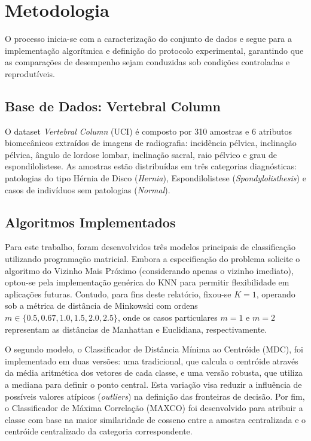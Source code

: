 \section{Metodologia}
\label{chap:metodologia}

O processo inicia-se com a caracterização do conjunto de dados e segue para a implementação algorítmica e definição do protocolo experimental, garantindo que as comparações de desempenho sejam conduzidas sob condições controladas e reprodutíveis.

\subsection{Base de Dados: Vertebral Column}
O dataset \textit{Vertebral Column} (UCI) é composto por 310 amostras e 6 atributos biomecânicos extraídos de imagens de radiografia: incidência pélvica, inclinação pélvica, ângulo de lordose lombar, inclinação sacral, raio pélvico e grau de espondilolistese. As amostras estão distribuídas em três categorias diagnósticas: patologias do tipo Hérnia de Disco (\textit{Hernia}), Espondilolistese (\textit{Spondylolisthesis}) e casos de indivíduos sem patologias (\textit{Normal}).

\subsection{Algoritmos Implementados}
Para este trabalho, foram desenvolvidos três modelos principais de classificação utilizando programação matricial. Embora a especificação do problema solicite o algoritmo do Vizinho Mais Próximo (considerando apenas o vizinho imediato), optou-se pela implementação genérica do KNN para permitir flexibilidade em aplicações futuras. Contudo, para fins deste relatório, fixou-se $K=1$, operando sob a métrica de distância de Minkowski com ordens $m \in \{0.5, 0.67, 1.0, 1.5, 2.0, 2.5\}$, onde os casos particulares $m=1$ e $m=2$ representam as distâncias de Manhattan e Euclidiana, respectivamente.

O segundo modelo, o Classificador de Distância Mínima ao Centróide (MDC), foi implementado em duas versões: uma tradicional, que calcula o centróide através da média aritmética dos vetores de cada classe, e uma versão robusta, que utiliza a mediana para definir o ponto central. Esta variação visa reduzir a influência de possíveis valores atípicos (\textit{outliers}) na definição das fronteiras de decisão. Por fim, o Classificador de Máxima Correlação (MAXCO) foi desenvolvido para atribuir a classe com base na maior similaridade de cosseno entre a amostra centralizada e o centróide centralizado da categoria correspondente.

